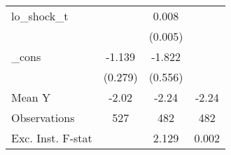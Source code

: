 {\begin{tabular}{l*{3}{c}}
\addlinespace
lo\_shock\_t  &                     &       0.008         &                     \\
            &                     &     (0.005)         &                     \\
\addlinespace
\_cons      &      -1.139\sym{***}&      -1.822\sym{***}&                     \\
            &     (0.279)         &     (0.556)         &                     \\
\midrule
Mean Y      &       -2.02         &       -2.24         &       -2.24         \\
Observations&         527         &         482         &         482         \\
Exc. Inst. F-stat&                     &       2.129         &       0.002         \\
\bottomrule
\end{tabular}
}
